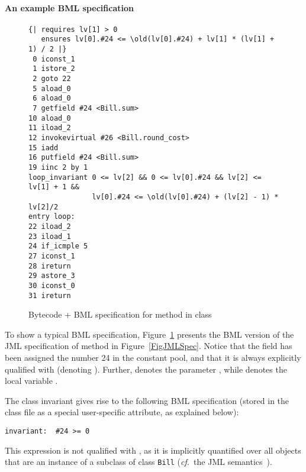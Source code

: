 

\paragraph{An example BML specification}
\label{sec:bml:example}


\begin{figure}[t]
{\small
\begin{verbatim}
{| requires lv[1] > 0 
   ensures lv[0].#24 <= \old(lv[0].#24) + lv[1] * (lv[1] + 1) / 2 |}
 0 iconst_1
 1 istore_2
 2 goto 22 
 5 aload_0
 6 aload_0
 7 getfield #24 <Bill.sum>
10 aload_0
11 iload_2
12 invokevirtual #26 <Bill.round_cost>
15 iadd
16 putfield #24 <Bill.sum>
19 iinc 2 by 1
loop_invariant 0 <= lv[2] && 0 <= lv[0].#24 && lv[2] <= lv[1] + 1 && 
               lv[0].#24 <= \old(lv[0].#24) + (lv[2] - 1) * lv[2]/2
entry loop: 
22 iload_2
23 iload_1
24 if_icmple 5 
27 iconst_1
28 ireturn
29 astore_3
30 iconst_0
31 ireturn
\end{verbatim}
}
\caption{Bytecode + BML specification for method  in class }\label{FigBMLSpec}
\end{figure}

To show a typical BML specification, Figure~\ref{FigBMLSpec} presents
the BML version of the JML specification of method
 in Figure~\ref{FigJMLSpec}. Notice that the
field
 has been assigned the number 24 in the constant
pool, and that it is always explicitly qualified with 
(denoting ). Further,  denotes the
parameter , while  denotes the local variable
.
 
The class invariant gives rise to the following BML specification
(stored in the class file as a special user-specific attribute, as
explained below):

\begin{verbatim}
invariant:  #24 >= 0
\end{verbatim}

This expression is not qualified with , as it is
implicitly quantified over all objects that are an instance of a
subclass of class \texttt{Bill} (\emph{cf.}\ the JML
semantics~\cite[\S 8.2]{JMLReferenceManual05}).

